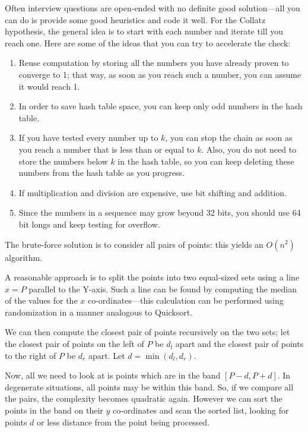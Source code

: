 Often interview questions are open-ended
with no definite good solution---all you can do is provide some good
heuristics and code it well. For the Collatz hypothesis,
the general idea is to start with each number and iterate
till you reach one. Here are some of the ideas that you can try to accelerate
the check:
\begin{enumerate}
\itemsep 1pt

\item Reuse computation by storing all the numbers you have already
  proven to converge  to 1; that way, as soon as you reach such a number, you can
  assume it would reach 1.
\item In order to save hash table space, you can keep only odd numbers
  in the hash table.
\item   If you have tested every number up to $k$, you can stop
  the chain as soon as you reach a number that is less than or equal to
  $k$. Also, you do not need to store the numbers below $k$ in the
  hash table, so you can keep deleting these numbers from the hash table as
  you progress.
\item If multiplication and division are expensive, use bit shifting
  and addition.
\item Since the numbers in a sequence may grow beyond 32 bits, you should
  use 64 bit longs and keep testing for overflow.
\end{enumerate}

The brute-force solution is to consider all pairs of points: this yields
an $O(n^2)$ algorithm.

A reasonable approach is to split the points into two equal-sized sets using a line $x = P$ parallel to the Y-axis.  Such a line
can be found by computing the median of the values for the
$x$ co-ordinates---this calculation can be performed
using randomization in a manner analogous to Quicksort.

We can then compute the closest pair of points recursively
on the two sets; let the closest pair of points on the left of
$P$ be $d_l$ apart and the closest pair of points
to the right of $P$ be $d_r$ apart.  Let $d = \min(d_l,d_r)$.

Now, all we need to look at is points which are in the band $[P-d, P+d]$.
In degenerate situations, all points may be within this band. So, if we
compare all the pairs, the complexity becomes quadratic again.
However we can sort the points in the band on their $y$ co-ordinates
and scan the sorted list, looking for points $d$ or less distance
from the point being processed.  

